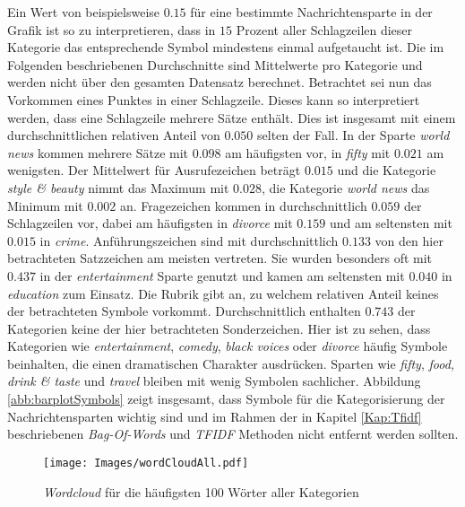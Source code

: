 \documentclass[a4paper,11pt]{article}
\begin{document}
Ein Wert von beispielsweise $0.15$ für eine bestimmte Nachrichtensparte in der Grafik ist so zu interpretieren, dass in $15$ Prozent aller Schlagzeilen dieser Kategorie das entsprechende Symbol mindestens einmal aufgetaucht ist. Die im Folgenden beschriebenen Durchschnitte sind Mittelwerte pro Kategorie und werden nicht über den gesamten Datensatz berechnet. Betrachtet sei nun das Vorkommen eines Punktes in einer Schlagzeile. Dieses kann so interpretiert werden, dass eine Schlagzeile mehrere Sätze enthält. Dies ist insgesamt mit einem durchschnittlichen relativen Anteil von $0.050$ selten der Fall. In der Sparte \textit{world news} kommen mehrere Sätze mit $0.098$ am häufigsten vor, in \textit{fifty} mit $0.021$ am wenigsten. Der Mittelwert für Ausrufezeichen beträgt $0.015$ und die Kategorie \textit{style \& beauty} nimmt das Maximum mit $0.028$, die Kategorie \textit{world news} das Minimum mit $0.002$ an. Fragezeichen kommen in durchschnittlich $0.059$ der Schlagzeilen vor, dabei am häufigsten in \textit{divorce} mit $0.159$ und am seltensten mit $0.015$ in \textit{crime}. Anführungszeichen sind mit durchschnittlich $0.133$ von den hier betrachteten Satzzeichen am meisten vertreten. Sie wurden besonders oft mit $0.437$ in der \textit{entertainment} Sparte genutzt und kamen am seltensten mit $0.040$ in \textit{education} zum Einsatz. Die Rubrik  gibt an, zu welchem relativen Anteil keines der betrachteten Symbole vorkommt. Durchschnittlich enthalten $0.743$ der Kategorien keine der hier betrachteten Sonderzeichen. Hier ist zu sehen, dass Kategorien wie \textit{entertainment}, \textit{comedy}, \textit{black voices} oder \textit{divorce} häufig Symbole beinhalten, die einen dramatischen Charakter ausdrücken. Sparten wie \textit{fifty}, \textit{food, drink \& taste} und \textit{travel} bleiben mit wenig Symbolen sachlicher. Abbildung \ref{abb:barplotSymbols} zeigt insgesamt, dass Symbole für die Kategorisierung der Nachrichtensparten wichtig sind und im Rahmen der in Kapitel \ref{Kap:Tfidf} beschriebenen \textit{Bag-Of-Words} und \textit{TFIDF} Methoden nicht entfernt werden sollten.

\begin{figure}[ht]
    \centering
\texttt{[image: Images/wordCloudAll.pdf]} 
\caption{\textit{Wordcloud} für die häufigsten 100 Wörter aller Kategorien}
\label{abb:WordcloudAll}
\end{figure}
\end{document}
